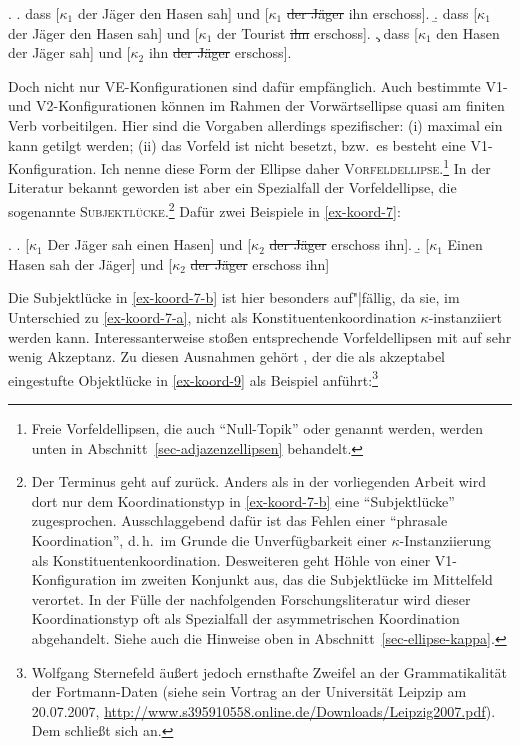 \ex. \label{ex-koord-8}
\a. \label{ex-koord-8-a}dass [$\kappa_1$ der Jäger den Hasen sah] und [$\kappa_1$ \sout{der Jäger} ihn erschoss].
\b. \label{ex-koord-8-b}dass [$\kappa_1$ der Jäger den Hasen sah] und [$\kappa_1$ der Tourist \sout{ihn} erschoss].
\c. \label{ex-koord-8-c}dass [$\kappa_1$ den Hasen der Jäger sah] und [$\kappa_2$ ihn \sout{der Jäger} erschoss].

Doch nicht nur VE-Konfigurationen sind dafür empfänglich. Auch bestimmte V1- und V2-Konfigurationen können im Rahmen der Vorwärtsellipse quasi am finiten Verb vorbeitilgen. Hier sind die Vorgaben allerdings spezifischer: (i) maximal ein  kann getilgt werden; (ii) das Vorfeld ist nicht besetzt, bzw.\ es besteht eine V1-Konfiguration. Ich nenne diese Form der Ellipse daher \textsc{Vorfeldellipse}.\footnote{Freie Vorfeldellipsen, die auch "`Null-Topik"' \citep{Fries:88} oder  genannt werden, werden unten in Abschnitt~\ref{sec-adjazenzellipsen} behandelt.} In der Literatur bekannt geworden ist aber ein Spezialfall der Vorfeldellipse, die sogenannte \textsc{Subjektlücke}.\footnote{Der Terminus geht auf \cite{Hoehle:83b} zurück. Anders als in der vorliegenden Arbeit wird dort nur dem Koordinationstyp in \ref{ex-koord-7-b} eine "`Subjektlücke"' zugesprochen. Ausschlaggebend dafür ist das Fehlen einer "`phrasale Koordination"', d.\,h.\ im Grunde die Unverfügbarkeit einer $\kappa$-Instanziierung als Konstituentenkoordination. Desweiteren geht Höhle von einer V1-Konfiguration im zweiten Konjunkt aus, das die Subjektlücke im Mittelfeld verortet. In der Fülle der nachfolgenden Forschungsliteratur wird dieser Koordinationstyp oft als Spezialfall der  asymmetrischen Koordination abgehandelt. Siehe auch die Hinweise oben in Abschnitt~\ref{sec-ellipse-kappa}.} Dafür zwei Beispiele in \ref{ex-koord-7}:   

\ex. \label{ex-koord-7}
\a. \label{ex-koord-7-a}[$\kappa_1$ Der Jäger sah einen Hasen] und [$\kappa_2$ \sout{der Jäger} erschoss ihn].
\b. \label{ex-koord-7-b}[$\kappa_1$ Einen Hasen sah der Jäger] und [$\kappa_2$ \sout{der Jäger} erschoss ihn]   

Die Subjektlücke in \ref{ex-koord-7-b} ist hier besonders auf"|fällig, da sie, im Unterschied zu \ref{ex-koord-7-a}, nicht als Konstituentenkoordination $\kappa$-instanziiert werden kann. Interessanterweise stoßen entsprechende Vorfeldellipsen mit  auf sehr wenig Akzeptanz. Zu diesen Ausnahmen gehört \cite{Fortmann:05}, der die als akzeptabel eingestufte Objektlücke in \ref{ex-koord-9} als Beispiel anführt:\footnote{Wolfgang Sternefeld äu\ss ert jedoch ernsthafte Zweifel an der Grammatikalität der Fortmann-Daten (siehe sein Vortrag an der Universität Leipzip am 20.07.2007, \url{http://www.s395910558.online.de/Downloads/Leipzig2007.pdf}). Dem schlie\ss t sich \citet[48ff]{Reich:09} an.} 

